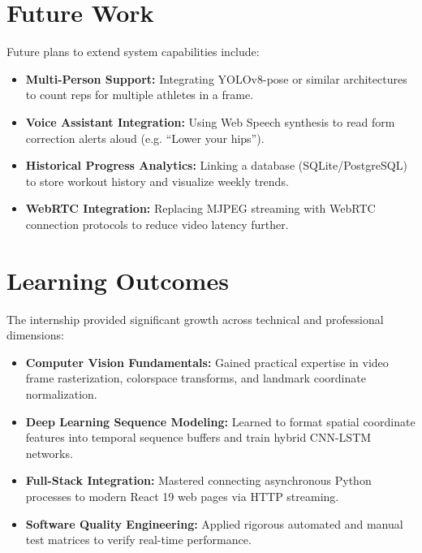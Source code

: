 \section{Future Work}
Future plans to extend system capabilities include:
\begin{itemize}
    \item \textbf{Multi-Person Support:} Integrating YOLOv8-pose or similar architectures to count reps for multiple athletes in a frame.
    \item \textbf{Voice Assistant Integration:} Using Web Speech synthesis to read form correction alerts aloud (e.g. ``Lower your hips'').
    \item \textbf{Historical Progress Analytics:} Linking a database (SQLite/PostgreSQL) to store workout history and visualize weekly trends.
    \item \textbf{WebRTC Integration:} Replacing MJPEG streaming with WebRTC connection protocols to reduce video latency further.
\end{itemize}

\section{Learning Outcomes}
The internship provided significant growth across technical and professional dimensions:
\begin{itemize}
    \item \textbf{Computer Vision Fundamentals:} Gained practical expertise in video frame rasterization, colorspace transforms, and landmark coordinate normalization.
    \item \textbf{Deep Learning Sequence Modeling:} Learned to format spatial coordinate features into temporal sequence buffers and train hybrid CNN-LSTM networks.
    \item \textbf{Full-Stack Integration:} Mastered connecting asynchronous Python processes to modern React 19 web pages via HTTP streaming.
    \item \textbf{Software Quality Engineering:} Applied rigorous automated and manual test matrices to verify real-time performance.
\end{itemize}
\newpage
